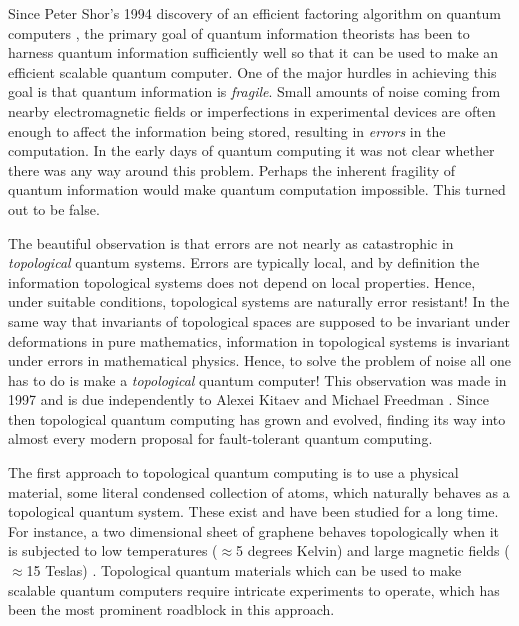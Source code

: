 \documentclass{article}
\theoremstyle{definition}
\numberwithin{figure}{section}
\begin{document}
Since Peter Shor’s 1994 discovery of an efficient factoring algorithm on quantum computers \cite{shor1994algorithms}, the primary goal of quantum information theorists has been to harness quantum information sufficiently well so that it can be used to make an efficient scalable quantum computer. One of the major hurdles in achieving this goal is that quantum information is \textit{fragile}. Small amounts of noise coming from nearby electromagnetic fields or imperfections in experimental devices are often enough to affect the information being stored, resulting in \textit{errors} in the computation. In the early days of quantum computing it was not clear whether there was any way around this problem. Perhaps the inherent fragility of quantum information would make quantum computation impossible. This turned out to be false.

The beautiful observation is that errors are not nearly as catastrophic in \textit{topological} quantum systems. Errors are typically local, and by definition the information topological systems does not depend on local properties. Hence, under suitable conditions, topological systems are naturally error resistant! In the same way that invariants of topological spaces are supposed to be invariant under deformations in pure mathematics, information in topological systems is invariant under errors in mathematical physics. Hence, to solve the problem of noise all one has to do is make a \textit{topological} quantum computer! This observation was made in 1997 and is due independently to Alexei Kitaev and Michael Freedman \cite{kitaev2003fault, freedman1998p}. Since then topological quantum computing has grown and evolved, finding its way into almost every modern proposal for fault-tolerant quantum computing.

The first approach to topological quantum computing is to use a physical material, some literal condensed collection of atoms, which naturally behaves as a topological quantum system. These exist and have been studied for a long time. For instance, a two dimensional sheet of graphene behaves topologically when it is subjected to low temperatures ($\approx$5 degrees Kelvin) and large magnetic fields ($\approx$15 Teslas) \cite{bolotin2009observation}. Topological quantum materials which can be used to make scalable quantum computers require intricate experiments to operate, which has been the most prominent roadblock in this approach.
\end{document}

